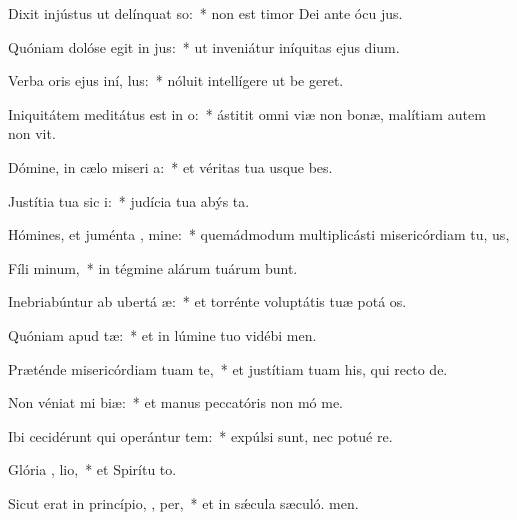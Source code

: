 \item Dixit injústus ut delínquat  so:~* non est timor Dei ante ócu jus.
\item Quóniam dolóse egit in  jus:~* ut inveniátur iníquitas ejus  dium.
\item Verba oris ejus iní,  lus:~* nóluit intellígere ut be geret.
\item Iniquitátem meditátus est in  o:~* ástitit omni viæ non bonæ, malítiam autem non vit.
\item Dómine, in cælo miseri a:~* et véritas tua usque  bes.
\item Justítia tua sic  i:~* judícia tua abýs ta.
\item Hómines, et juménta , mine:~* quemádmodum multiplicásti misericórdiam tu, us,
\item Fíli  minum,~* in tégmine alárum tuárum bunt.
\item Inebriabúntur ab ubertá  æ:~* et torrénte voluptátis tuæ potá os.
\item Quóniam apud    tæ:~* et in lúmine tuo vidébi men.
\item Præténde misericórdiam tuam  te,~* et justítiam tuam his, qui recto  de.
\item Non véniat mi  biæ:~* et manus peccatóris non mó me.
\item Ibi cecidérunt qui operántur tem:~* expúlsi sunt, nec potué re.
\item Glória ,  lio,~* et Spirítu to.
\item Sicut erat in princípio,  ,  per,~* et in sǽcula sæculó. men.
